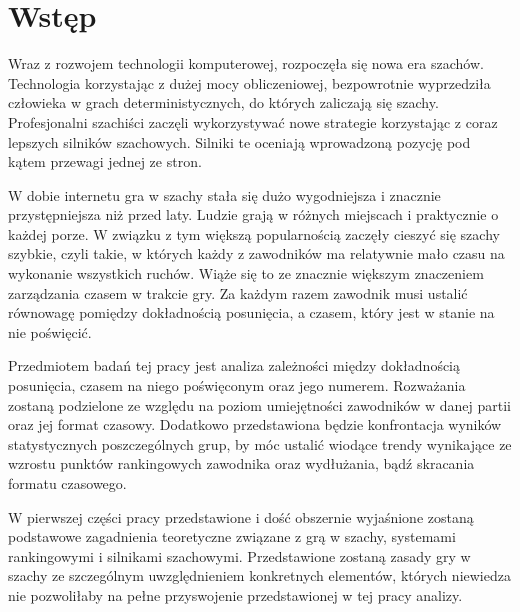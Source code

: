 \documentclass[inzynierska]{pwr_wmat_praca_dyplomowa}
\theoremstyle{plain}
\numberwithin{theorem}{chapter}
\theoremstyle{definition}
\numberwithin{theorem}{chapter}
\begin{document}

\frontmatter
\maketitle
\mainmatter
\tableofcontents

{\backmatter \chapter{Wstęp}}


Wraz z rozwojem technologii komputerowej, rozpoczęła się nowa era szachów. Technologia korzystając z dużej mocy obliczeniowej, bezpowrotnie wyprzedziła człowieka w grach deterministycznych, do których zaliczają się szachy. Profesjonalni szachiści zaczęli wykorzystywać nowe strategie korzystając z coraz lepszych silników szachowych. Silniki te oceniają wprowadzoną pozycję pod kątem przewagi jednej ze stron. 


W dobie internetu gra w szachy stała się dużo wygodniejsza i znacznie przystępniejsza niż przed laty. Ludzie grają w różnych miejscach i praktycznie o każdej porze. W związku z tym większą popularnością zaczęły cieszyć się szachy szybkie, czyli takie, w których każdy z zawodników ma relatywnie mało czasu na wykonanie wszystkich ruchów. Wiąże się to ze znacznie większym znaczeniem zarządzania czasem w trakcie gry. Za każdym razem zawodnik musi ustalić równowagę pomiędzy dokładnością posunięcia, a czasem, który jest w stanie na nie poświęcić. 


Przedmiotem badań tej pracy jest analiza zależności między dokładnością posunięcia, czasem na niego poświęconym oraz jego numerem. Rozważania zostaną podzielone ze względu na poziom umiejętności zawodników w danej partii oraz jej format czasowy. Dodatkowo przedstawiona będzie konfrontacja wyników statystycznych poszczególnych grup, by móc ustalić wiodące trendy wynikające ze wzrostu punktów rankingowych zawodnika oraz wydłużania, bądź skracania formatu czasowego.


W pierwszej części pracy przedstawione i dość obszernie wyjaśnione zostaną podstawowe zagadnienia teoretyczne związane z grą w szachy, systemami rankingowymi i silnikami szachowymi. Przedstawione zostaną zasady gry w szachy ze szczególnym uwzględnieniem konkretnych elementów, których niewiedza nie pozwoliłaby na pełne przyswojenie przedstawionej w tej pracy analizy.
\end{document}
